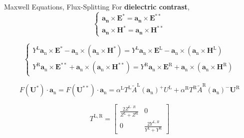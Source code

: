 \begin{frame}{Maxwell Equations, Flux-Splitting}
For \textbf{dielectric contrast},
\begin{equation}
\left\{\begin{array}{l}{\boldsymbol{a}_{\mathbf{n}} \times \boldsymbol{E}^{*}=\boldsymbol{a}_{\mathbf{n}} \times \boldsymbol{E}^{* *}} \\ {\boldsymbol{a}_{\mathbf{n}} \times \boldsymbol{H}^{*}=\boldsymbol{a}_{\mathbf{n}} \times \boldsymbol{H}^{* *}}\end{array}\right.
\end{equation}


\begin{equation}
\left\{\begin{array}{l}{Y^{\mathrm{L}} \boldsymbol{a}_{\mathrm{n}} \times \boldsymbol{E}^{*}-\boldsymbol{a}_{\mathrm{n}} \times\left(\boldsymbol{a}_{\mathrm{n}} \times \boldsymbol{H}^{*}\right)=Y^{\mathrm{L}} \boldsymbol{a}_{\mathrm{n}} \times \boldsymbol{E}^{\mathrm{L}}-\boldsymbol{a}_{\mathrm{n}} \times\left(\boldsymbol{a}_{\mathrm{n}} \times \boldsymbol{H}^{\mathrm{L}}\right)} \\ {Y^{\mathrm{R}} \boldsymbol{a}_{\mathrm{n}} \times \boldsymbol{E}^{* *}+\boldsymbol{a}_{\mathrm{n}} \times\left(\boldsymbol{a}_{\mathrm{n}} \times \boldsymbol{H}^{* *}\right)=Y^{\mathrm{R}} \boldsymbol{a}_{\mathrm{n}} \times \boldsymbol{E}^{\mathrm{R}}+\boldsymbol{a}_{\mathrm{n}} \times\left(\boldsymbol{a}_{\mathrm{n}} \times \boldsymbol{H}^{\mathrm{R}}\right)}\end{array}\right.
\end{equation}


\begin{equation}
F\left(\boldsymbol{U}^{*}\right) \cdot \boldsymbol{a}_{\mathrm{n}}=F\left(\boldsymbol{U}^{* *}\right) \cdot \boldsymbol{a}_{\mathrm{n}}=\alpha^{\mathrm{L}} T^{\mathrm{L}} \tilde{A}^{\mathrm{L}}\left(\boldsymbol{a}_{\mathrm{n}}\right)^{+} U^{\mathrm{L}}+\alpha^{\mathrm{R}} T^{\mathrm{R}} \tilde{A}^{\mathrm{R}}\left(\boldsymbol{a}_{\mathrm{n}}\right)^{-} \boldsymbol{U}^{\mathrm{R}}
\end{equation}

\begin{equation}
T^{\mathrm{L}, \mathrm{R}}=\left[\begin{array}{cc}{\frac{2 Z^{\mathrm{L} \cdot R}}{Z^{\mathrm{L}}+Z^{\mathrm{R}}}} & {0} \\ {0} & {\frac{2 Y^{L, R}}{Y^{\mathrm{L}}+Y^{\mathrm{R}}}}\end{array}\right]
\end{equation}





\end{frame}

